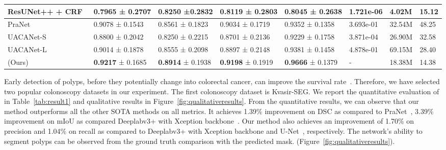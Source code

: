\documentclass[journal,twoside,web]{IEEEtran}
\newcommand{\sysname}{\text{MSRF-Net}\xspace}
\begin{document}
\begin{table*}[!t]
\begin{tabular}{@{}l|l|l|l|l|l|l|l@{}}
ResUNet++ + CRF~\cite{jha2021comprehensive}&0.7965 ± 0.2707 & 0.8250 ±0.2832 &0.8119 ± 0.2803  &0.8045 ± 0.2638 & 1.721e-06 & 4.02M & 15.12 \\ \hline

PraNet~\cite{fan2020pranet}  & 0.9078 ± 0.1543 & 0.8561 ± 0.1823 & 0.9034 ± 0.1719 & 0.9352 ± 0.1358 & 3.693e-01 & 32.54M & 48.25  \\ \hline

UACANet-S~\cite{kim2021uacanet} & 0.8800 ± 0.2042 & 0.8250 ± 0.2215 & 0.8701 ± 0.2136 & 0.9229 ± 0.1758 & 3.871e-04 & 26.90M & 32.58 \\ \hline

UACANet-L~\cite{kim2021uacanet} & 0.9014 ± 0.1878 & 0.8555 ± 0.2098 & 0.8897 ± 0.2148 & 0.9381 ± 0.1458 & 4.878e-01 & 69.15M & 28.40 \\ \hline

\sysname(Ours) & \textbf{0.9217} ± 0.1685 & \textbf{0.8914} ± 0.1938 & \textbf{0.9198} ± 0.1919 & \textbf{0.9666} ± 0.1379 & - & 18.38M & 14.38\\ \hline
\bottomrule
\end{tabular}
\label{tab:result1}
\vspace{-5mm}
\end{table*}

Early detection of polyps, before they potentially change into colorectal cancer, can improve the survival rate~\cite{levin2008screening}. Therefore, we have selected two popular colonoscopy datasets in our experiment. The first colonoscopy dataset is Kvasir-SEG. We report the quantitative evaluation of \sysname in Table~\ref{tab:result1} and qualitative results in Figure~\ref{fig:qualitativeresults}. From the quantitative results, we can observe that our method outperforms all the other \ac{SOTA} methods on all metrics. It achieves 1.39\% improvement on \ac{DSC} as compared to PraNet~\cite{fan2020pranet}, 3.39\% improvement on \ac{mIoU} as compared Deeplabv3+ with Xception backbone~\cite{chen2018encoder}. Our method also achieves an improvement of 1.70\% on precision and 1.04\% on recall as compared to Deeplabv3+ with Xception backbone and U-Net~\cite{ronneberger2015u}, respectively. The network's ability to segment polyps can be observed from the ground truth comparison with the predicted mask. (Figure~\ref{fig:qualitativeresults}). 
\end{document}
